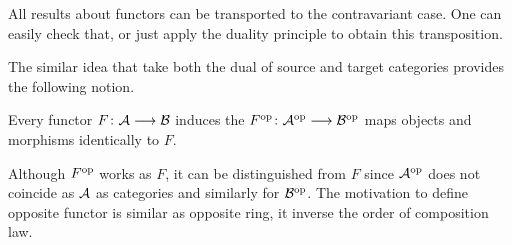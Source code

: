   All results about functors can be transported to the contravariant case. One can easily check that, or just apply the duality principle to obtain this transposition.

  The similar idea that take both the dual of source and target categories provides the following notion.
  \begin{defn}
    Every functor $F\colon{\cal A}\longrightarrow{\cal B}$ induces the  $F^{\operatorname{op}}\colon {\cal A}^{\operatorname{op}} \longrightarrow {\cal B}^{\operatorname{op}}$ maps objects and morphisms identically to $F$.  
  \end{defn}
  Although $F^{\operatorname{op}}$ works as $F$, it can be distinguished from $F$ since ${\cal A}^{\operatorname{op}}$ does not coincide as ${\cal A}$ as categories and similarly for ${\cal B}^{\operatorname{op}}$. The motivation to define opposite functor is similar as opposite ring, it inverse the order of composition law.

